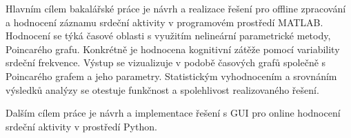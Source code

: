 Hlavním cílem bakalářské práce je návrh a realizace řešení pro offline
zpracování a hodnocení záznamu srdeční aktivity v programovém prostředí MATLAB.
Hodnocení se týká časové oblasti s využitím nelineární parametrické metody,
Poincarého grafu. Konkrétně je hodnocena kognitivní zátěže pomocí variability
srdeční frekvence. Výstup se vizualizuje v podobě časových grafů společně s
Poincarého grafem a jeho parametry. Statistickým vyhodnocením a srovnáním
výsledků analýzy se otestuje funkčnost a spolehlivost realizovaného řešení.

Dalším cílem práce je návrh a implementace řešení s GUI pro online hodnocení
srdeční aktivity v prostředí Python.

